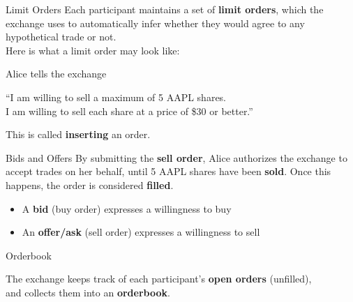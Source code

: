 \begin{frame}{Limit Orders}
  Each participant maintains a set of \textbf{limit orders}, which the exchange uses
  to automatically infer whether they would agree to any hypothetical trade or not.\\
  Here is what a limit order may look like:
  \begin{sqt:tip}
    Alice tells the exchange
    \begin{center}
      ``I am willing to sell a maximum of 5 AAPL shares.\\
      I am willing to sell each share at a price of \$30 or better.''
    \end{center}
  \end{sqt:tip}

  This is called \textbf{inserting} an order.

  \begin{center}
    
  \end{center}
\end{frame}

\begin{frame}{Bids and Offers}
  By submitting the \textbf{sell order}, Alice authorizes the exchange to accept trades on her behalf,
  until 5 AAPL shares have been \textbf{sold}. Once this happens, the order is considered \textbf{filled}.

  \begin{sqt:definition}
    \begin{itemize}
      \item A \textbf{bid} (buy order) expresses a willingness to buy
      \item An \textbf{offer/ask} (sell order) expresses a willingness to sell
    \end{itemize}
  \end{sqt:definition}

  \begin{center}
    
  \end{center}
\end{frame}

\begin{frame}{Orderbook}
  \begin{sqt:definition}
    The exchange keeps track of each participant's \textbf{open orders} (unfilled),\\
    and collects them into an \textbf{orderbook}.
  \end{sqt:definition}

  \begin{center}
    
  \end{center}
\end{frame}

